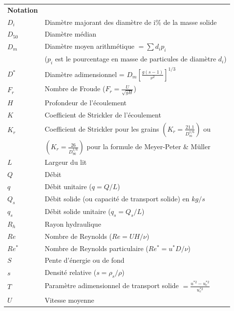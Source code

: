 \documentclass[a4paper,10pt]{article}
\begin{document}
\newpage
{}
\begin{tabular}{ l l }

\textbf{Notation}		& $ $ \\ [0.2 cm]
$D_i$					& Diam\`etre majorant des diam\`etre de i\% de la masse solide \\
$D_{50}$				& Diam\`etre m\'edian \\
$D_m$					& Diam\`etre moyen arithm\'etique $ = \sum d_i p_i $ \\
$ $						& ($p_i$ est le pourcentage en masse de particules de diam\`etre $d_i$) \\
$D^*$					& Diam\`etre adimensionnel = $D_m \left[\frac{g(s-1)}{\nu^2}\right]^{1/3}$ \\
$F_r$					& Nombre de Froude ($ F_r = \frac{U}{ \sqrt{gH} } $) \\
$H$						& Profondeur de l'\'ecoulement \\
$K$						& Coefficient de Strickler de l'\'ecoulement \\
$K_r$					& Coefficient de Strickler pour les grains $ (K_r = \frac{21.1}{D_m^{1/6}}) $ ou \\
$ $						& $ (K_r = \frac{26}{D_{90}	^{1/6}}) $ pour la formule de Meyer-Peter \& M\"uller \\
$L$						& Largeur du lit \\
$Q$						& D\'ebit \\
$q$						& D\'ebit unitaire ($q = Q/L$) \\
$Q_s$					& D\'ebit solide (ou capacit\'e de transport solide) en $kg/s$ \\
$q_s$					& D\'ebit solide unitaire ($q_s = Q_s / L$) \\
$R_h$					& Rayon hydraulique \\
$Re$					& Nombre de Reynolds ($Re = UH / \nu$) \\
$Re^*$					& Nombre de Reynolds particulaire ($Re^* = u^* D / \nu$) \\
$S$						& Pente d'\'energie ou de fond \\
$s$						& Densit\'e relative ($s = \rho_s/\rho$) \\
$T$						& Param\`etre adimensionnel de transport solide $ = \frac{u^{*2}-u_c^{*2}}{u_c^{*2}} $ \cite{van1}\\
$U$						& Vitesse moyenne \\

\end{tabular}
\end{document}
